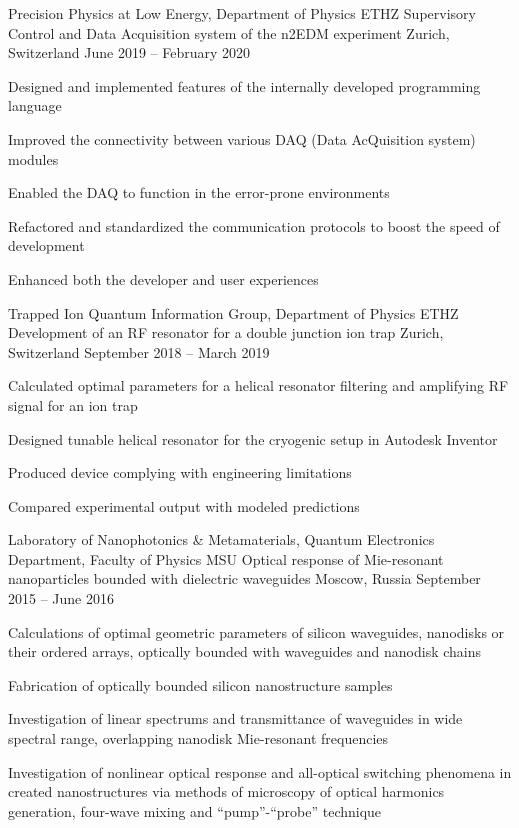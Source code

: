 \begin{cventries}
	\cventry
		{Precision Physics at Low Energy, Department of Physics ETHZ}
		{Supervisory Control and Data Acquisition system of the n2EDM experiment}
		{Zurich, Switzerland}
		{June 2019 -- February 2020}
		{
			\begin{cvitems}
				\item {Designed and implemented features of the internally developed programming language}
				\item {Improved the connectivity between various DAQ (Data AcQuisition system) modules}
				\item {Enabled the DAQ to function in the error-prone environments}
				\item {Refactored and standardized the communication protocols to boost the speed of development}
				\item {Enhanced both the developer and user experiences}
			\end{cvitems}
		}

	\cventry
		{Trapped Ion Quantum Information Group, Department of Physics ETHZ}
		{Development of an RF resonator for a double junction ion trap}
		{Zurich, Switzerland}
		{September 2018 -- March 2019}
		{
			\begin{cvitems}
				\item {Calculated optimal parameters for a helical resonator filtering and amplifying RF signal for an ion trap}
				\item {Designed tunable helical resonator for the cryogenic setup in Autodesk Inventor}
				\item {Produced device complying with engineering limitations}
				\item {Compared experimental output with modeled predictions}
			\end{cvitems}
		}

	\cventry
		{Laboratory of Nanophotonics \& Metamaterials, Quantum Electronics Department, Faculty of Physics MSU}
		{Optical response of Mie-resonant nanoparticles bounded with dielectric waveguides}
		{Moscow, Russia}
		{September 2015 -- June 2016}
		{
			\begin{cvitems}
				\item {Calculations of optimal geometric parameters of silicon waveguides, nanodisks or their ordered arrays, optically bounded with waveguides and nanodisk chains }
				\item {Fabrication of optically bounded silicon nanostructure samples}
				\item {Investigation of linear spectrums and transmittance of waveguides in wide spectral range, overlapping nanodisk Mie-resonant frequencies }
				\item {Investigation of nonlinear optical response and all-optical switching phenomena in created nanostructures via methods of microscopy of optical harmonics generation, four-wave mixing and ``pump''-``probe'' technique}
			\end{cvitems}
		}


\end{cventries}
